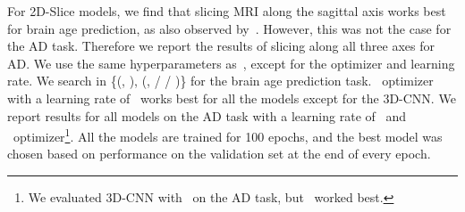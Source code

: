 For 2D-Slice  models, we find that slicing MRI along the sagittal axis works best for brain age prediction, as also observed by~\cite{gupta2021improved}. However, this was not the case for the AD task. Therefore we report the results of slicing along all three axes for AD.  We use the same hyperparameters as~\cite{gupta2021improved}, except for the optimizer and learning rate.
We search in \{(\adam, \four), (\sgd, \three / \four / \five)\} for the brain age prediction task.
\adam\ optimizer with a learning rate of \four\ works best for all the models except for the 3D-CNN. We report results for all models on the AD task with a learning rate of \four\ and \adam\ optimizer\footnote{We evaluated 3D-CNN with \sgd\ on the AD task, but \adam\ worked best.}. All the models are trained for 100 epochs, and the best model was chosen based on performance on the validation set at the end of every epoch.




